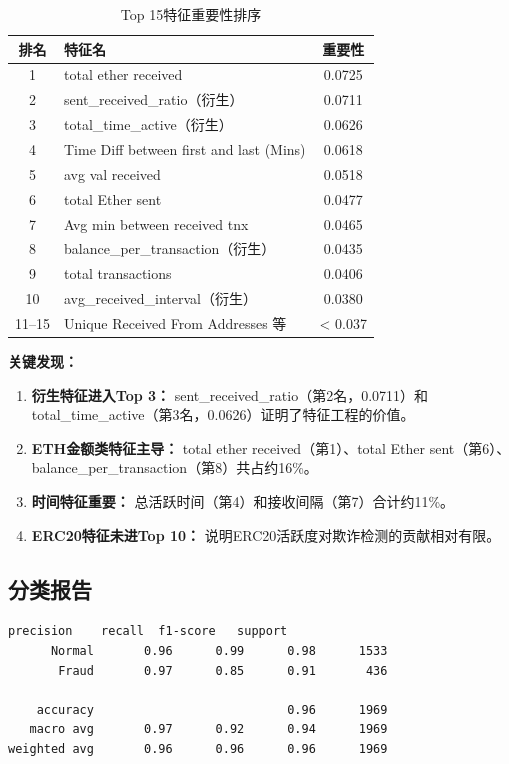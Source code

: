 \documentclass[12pt,a4paper]{article}
\begin{document}
\begin{table}[H]
\centering
\caption{Top 15特征重要性排序}
\begin{tabular}{@{}clc@{}}
\toprule
\textbf{排名} & \textbf{特征名} & \textbf{重要性} \\
\midrule
1 & total ether received & 0.0725 \\
2 & sent\_received\_ratio（衍生） & 0.0711 \\
3 & total\_time\_active（衍生） & 0.0626 \\
4 & Time Diff between first and last (Mins) & 0.0618 \\
5 & avg val received & 0.0518 \\
6 & total Ether sent & 0.0477 \\
7 & Avg min between received tnx & 0.0465 \\
8 & balance\_per\_transaction（衍生） & 0.0435 \\
9 & total transactions & 0.0406 \\
10 & avg\_received\_interval（衍生） & 0.0380 \\
11--15 & Unique Received From Addresses 等 & < 0.037 \\
\bottomrule
\end{tabular}
\end{table}

\textbf{关键发现：}
\begin{enumerate}
    \item \textbf{衍生特征进入Top 3：} sent\_received\_ratio（第2名，0.0711）和total\_time\_active（第3名，0.0626）证明了特征工程的价值。
    \item \textbf{ETH金额类特征主导：} total ether received（第1）、total Ether sent（第6）、balance\_per\_transaction（第8）共占约16\%。
    \item \textbf{时间特征重要：} 总活跃时间（第4）和接收间隔（第7）合计约11\%。
    \item \textbf{ERC20特征未进Top 10：} 说明ERC20活跃度对欺诈检测的贡献相对有限。
\end{enumerate}

\subsection{分类报告}

\begin{lstlisting}[language=bash]
              precision    recall  f1-score   support
      Normal       0.96      0.99      0.98      1533
       Fraud       0.97      0.85      0.91       436

    accuracy                           0.96      1969
   macro avg       0.97      0.92      0.94      1969
weighted avg       0.96      0.96      0.96      1969
\end{lstlisting}
\end{document}
